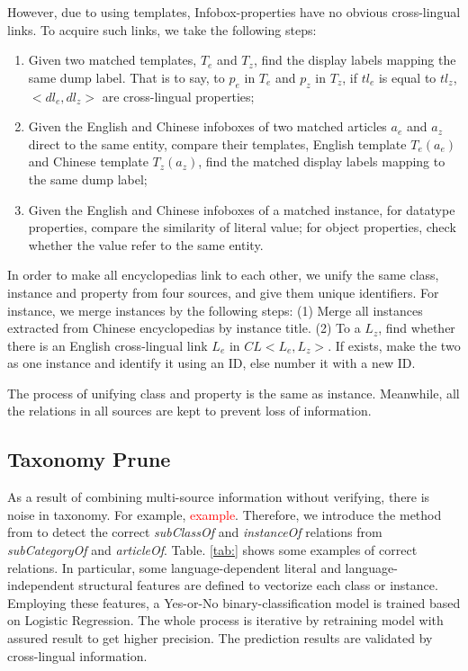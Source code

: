 \documentclass[runningheads,a4paper]{llncs}
\begin{document}
\begin{CJK*}{UTF8}{song}
However, due to using templates, Infobox-properties have no obvious cross-lingual links. To acquire such links, we take the following steps:
\begin{enumerate}[1)]
    \item Given two matched templates, $T_{e}$ and $T_{z}$, find the display labels mapping the same dump label. That is to say, to $p_{e}$ in $T_{e}$ and $p_{z}$ in $T_{z}$, if $tl_{e}$ is equal to $tl_{z}$, $<dl_{e},dl_{z}>$ are cross-lingual properties;
    \item Given the English and Chinese infoboxes of two matched articles $a_{e}$ and $a_{z}$ direct to the same entity, compare their templates, English template $T_{e}(a_{e})$ and Chinese template $T_{z}(a_{z})$, find the matched display labels mapping to the same dump label; 
    \item Given the English and Chinese infoboxes of a matched instance, for datatype properties, compare the similarity of literal value; for object properties, check whether the value refer to the same entity.
\end{enumerate}

In order to make all encyclopedias link to each other, we unify the same class, instance and property from four sources, and give them unique identifiers. For instance, we merge instances by the following steps: (1) Merge all instances extracted from Chinese encyclopedias by instance title. (2) To a $L_{z}$, find whether there is an English cross-lingual link $L_{e}$ in $CL<L_{e}, L_{z}>$. If exists, make the two as one instance and identify it using an ID, else number it with a new ID.

The process of unifying class and property is the same as instance. Meanwhile, all the relations in all sources are kept to prevent loss of information.

\subsection{Taxonomy Prune}
\label{sec:tp}

As a result of combining multi-source information without verifying, there is noise in taxonomy. For example, \textcolor{red}{example}. Therefore, we introduce the method from\cite{wang2014cross} to detect the correct \textit{subClassOf} and \textit{instanceOf} relations from \textit{subCategoryOf} and \textit{articleOf}. Table. \ref{tab:} shows some examples of correct relations. In particular, some language-dependent literal and language-independent structural features are defined to vectorize each class or instance. Employing these features, a Yes-or-No binary-classification model is trained based on Logistic Regression. The whole process is iterative by retraining model with assured result to get higher precision. The prediction results are validated by cross-lingual information.


\end{CJK*}
\end{document}
